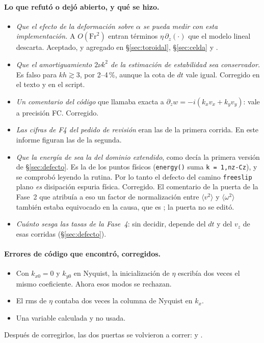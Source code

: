 \paragraph{Lo que refutó o dejó abierto, y qué se hizo.}
\begin{itemize}
\item \emph{Que el efecto de la deformación sobre $\alpha$ se pueda medir con esta
  implementación.} A $O(\mathrm{Fr}^2)$ entran términos $\eta\,\partial_z(\cdot)$ que el
  modelo lineal descarta. Aceptado, y agregado en §\ref{sec:toroidal}, §\ref{sec:celda} y
  .
\item \emph{Que el amortiguamiento $2\nu k^2$ de la estimación de estabilidad sea
  conservador.} Es falso para $kh\gtrsim3$, por 2--4\,\%, aunque la cota de $dt$ vale igual.
  Corregido en el texto y en el script.
\item \emph{Un comentario del código} que llamaba exacta a
  $\partial_zw=-i(k_xv_x+k_yv_y)$: vale a precisión FC. Corregido.
\item \emph{Las cifras de F4 del pedido de revisión} eran las de la primera corrida. En este
  informe figuran las de la segunda.
\item \emph{Que la energía de  sea la del dominio extendido}, como
  decía la primera versión de §\ref{sec:defecto}. Es la de los puntos físicos
  (\texttt{energy()} suma \texttt{k = 1,nz-Cz}), y se comprobó leyendo la rutina. Por lo
  tanto el defecto del camino \texttt{freeslip} plano \emph{es} disipación espuria física.
  Corregido. El comentario de la puerta de la Fase~2 que atribuía a eso un factor de
  normalización entre $\langle v^2\rangle$ y $\langle\omega^2\rangle$ también estaba
  equivocado en la causa, que es ; la puerta no se editó.
\item \emph{Cuánto sesga las tasas de la Fase~4}: sin decidir, depende del $dt$ y del $v_z$
  de esas corridas (§\ref{sec:defecto}).
\end{itemize}

\paragraph{Errores de código que encontró, corregidos.}
\begin{itemize}
\item Con $k_{x0}=0$ y $k_{y0}$ en Nyquist, la inicialización de $\eta$ escribía dos veces el
  mismo coeficiente. Ahora esos modos se rechazan.
\item El rms de $\eta$ contaba dos veces la columna de Nyquist en $k_x$.
\item Una variable calculada y no usada.
\end{itemize}
Después de corregirlos, las dos puertas se volvieron a correr: \PuertaFinal{} y
\FaseDosRegresion.

